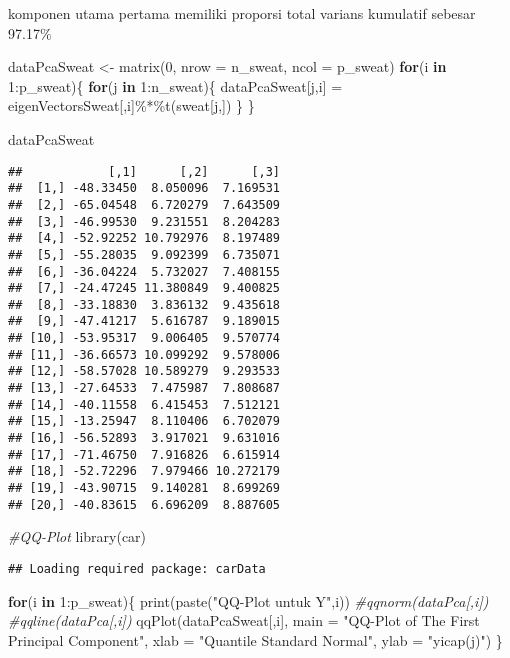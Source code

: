 \documentclass[
]{article}
\newenvironment{Shaded}{\begin{snugshade}}{\end{snugshade}}
\newcommand{\AttributeTok}[1]{\textcolor[rgb]{0.77,0.63,0.00}{#1}}
\newcommand{\CommentTok}[1]{\textcolor[rgb]{0.56,0.35,0.01}{\textit{#1}}}
\newcommand{\ControlFlowTok}[1]{\textcolor[rgb]{0.13,0.29,0.53}{\textbf{#1}}}
\newcommand{\DecValTok}[1]{\textcolor[rgb]{0.00,0.00,0.81}{#1}}
\newcommand{\FunctionTok}[1]{\textcolor[rgb]{0.00,0.00,0.00}{#1}}
\newcommand{\NormalTok}[1]{#1}
\newcommand{\OtherTok}[1]{\textcolor[rgb]{0.56,0.35,0.01}{#1}}
\newcommand{\SpecialCharTok}[1]{\textcolor[rgb]{0.00,0.00,0.00}{#1}}
\newcommand{\StringTok}[1]{\textcolor[rgb]{0.31,0.60,0.02}{#1}}
\begin{document}
komponen utama pertama memiliki proporsi total varians kumulatif sebesar
97.17\%

\begin{Shaded}
\begin{Highlighting}[]
\NormalTok{dataPcaSweat }\OtherTok{\textless{}{-}} \FunctionTok{matrix}\NormalTok{(}\DecValTok{0}\NormalTok{, }\AttributeTok{nrow =}\NormalTok{ n\_sweat, }\AttributeTok{ncol =}\NormalTok{ p\_sweat)}
\ControlFlowTok{for}\NormalTok{(i }\ControlFlowTok{in} \DecValTok{1}\SpecialCharTok{:}\NormalTok{p\_sweat)\{}
  \ControlFlowTok{for}\NormalTok{(j }\ControlFlowTok{in} \DecValTok{1}\SpecialCharTok{:}\NormalTok{n\_sweat)\{}
\NormalTok{    dataPcaSweat[j,i] }\OtherTok{=}\NormalTok{ eigenVectorsSweat[,i]}\SpecialCharTok{\%*\%}\FunctionTok{t}\NormalTok{(sweat[j,])}
\NormalTok{  \}}
\NormalTok{\}}

\NormalTok{dataPcaSweat}
\end{Highlighting}
\end{Shaded}

\begin{verbatim}
##            [,1]      [,2]      [,3]
##  [1,] -48.33450  8.050096  7.169531
##  [2,] -65.04548  6.720279  7.643509
##  [3,] -46.99530  9.231551  8.204283
##  [4,] -52.92252 10.792976  8.197489
##  [5,] -55.28035  9.092399  6.735071
##  [6,] -36.04224  5.732027  7.408155
##  [7,] -24.47245 11.380849  9.400825
##  [8,] -33.18830  3.836132  9.435618
##  [9,] -47.41217  5.616787  9.189015
## [10,] -53.95317  9.006405  9.570774
## [11,] -36.66573 10.099292  9.578006
## [12,] -58.57028 10.589279  9.293533
## [13,] -27.64533  7.475987  7.808687
## [14,] -40.11558  6.415453  7.512121
## [15,] -13.25947  8.110406  6.702079
## [16,] -56.52893  3.917021  9.631016
## [17,] -71.46750  7.916826  6.615914
## [18,] -52.72296  7.979466 10.272179
## [19,] -43.90715  9.140281  8.699269
## [20,] -40.83615  6.696209  8.887605
\end{verbatim}

\begin{Shaded}
\begin{Highlighting}[]
\CommentTok{\#QQ{-}Plot}
\FunctionTok{library}\NormalTok{(car)}
\end{Highlighting}
\end{Shaded}

\begin{verbatim}
## Loading required package: carData
\end{verbatim}

\begin{Shaded}
\begin{Highlighting}[]
\ControlFlowTok{for}\NormalTok{(i }\ControlFlowTok{in} \DecValTok{1}\SpecialCharTok{:}\NormalTok{p\_sweat)\{}
\FunctionTok{print}\NormalTok{(}\FunctionTok{paste}\NormalTok{(}\StringTok{"QQ{-}Plot untuk Y"}\NormalTok{,i))}
\CommentTok{\#qqnorm(dataPca[,i])}
\CommentTok{\#qqline(dataPca[,i])}
\FunctionTok{qqPlot}\NormalTok{(dataPcaSweat[,i], }\AttributeTok{main =} \StringTok{"QQ{-}Plot of The First Principal Component"}\NormalTok{, xlab }
\OtherTok{=} \StringTok{"Quantile Standard Normal"}\NormalTok{, }\AttributeTok{ylab =} \StringTok{"yicap(j)"}\NormalTok{)}
\NormalTok{\}}
\end{Highlighting}
\end{Shaded}
\end{document}
